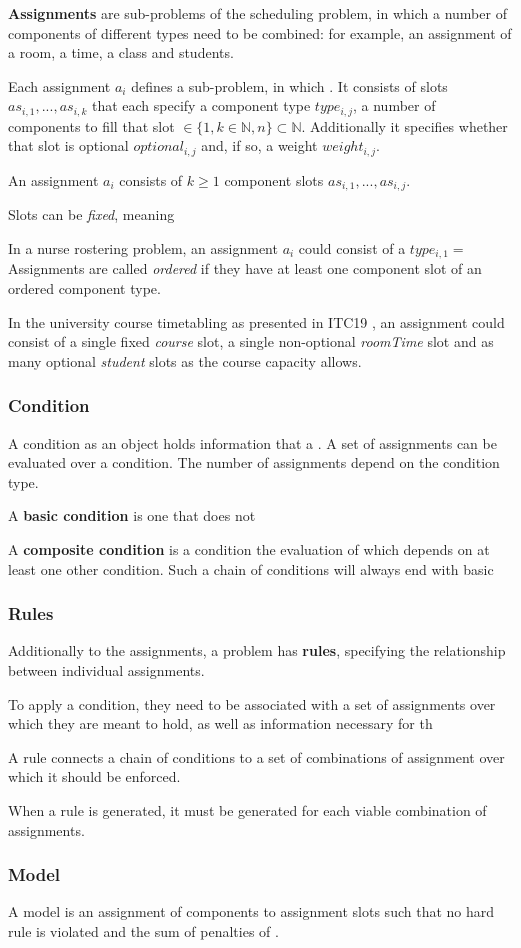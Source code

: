 \textbf{Assignments} are sub-problems of the scheduling problem, in which a number of components of different types need to be combined: for example, an assignment of a room, a time, a class and students. 

Each assignment $a_i$ defines a sub-problem, in which . It consists of slots $as_{i, 1},...,as_{i,k}$ that each specify a component type $type_{i,j}$, a number of components to fill that slot $\in \{1, k\in\mathbb{N}, n\} \subset \mathbb{N}$. Additionally it specifies whether that slot is optional $optional_{i,j}$ and, if so, a weight $weight_{i,j}$.

An assignment $a_i$ consists of $k\geq 1$ component slots $as_{i,1},...,as_{i,j}$.

Slots can be \textit{fixed}, meaning 

In a nurse rostering problem, an assignment $a_i$ could consist of a 
$type_{i,1} = $
Assignments are called \textit{ordered} if they have at least one component slot of an ordered component type.

In the university course timetabling as presented in ITC19 \cite{muller2018university}, an assignment could consist of a single fixed \textit{course} slot, a single non-optional \textit{roomTime} slot and as many optional \textit{student} slots as the course capacity allows. 

\subsubsection{Condition}
A condition as an object holds information that a .
A set of assignments can be evaluated over a condition. The number of assignments depend on the condition type.

A \textbf{basic condition} is one that does not 

A \textbf{composite condition} is a condition the evaluation of which depends on at least one other condition. Such a chain of conditions will always end with basic 


\subsubsection{Rules}

Additionally to the assignments, a problem has \textbf{rules}, specifying the relationship between individual assignments. 

To apply a condition, they need to be associated with a set of assignments over which they are meant to hold, as well as information necessary for th

A rule connects a chain of conditions to a set of combinations of assignment over which it should be enforced.

When a rule is generated, it must be generated for each viable combination of assignments. 



\subsubsection{Model}

A model is an assignment of components to assignment slots such that no hard rule is violated and the sum of penalties of .

